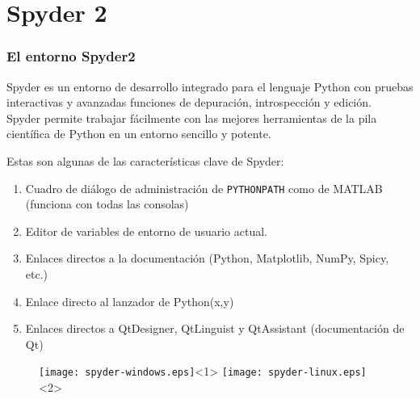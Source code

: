 \section{Spyder 2}
\begin{frame}
\frametitle{El entorno Spyder2}
Spyder es un entorno de desarrollo integrado para el lenguaje Python con pruebas interactivas y avanzadas funciones de depuraci\'{o}n, introspecci\'{o}n y edici\'{o}n.
\\
\medskip
Spyder permite trabajar f\'{a}cilmente con las mejores herramientas de la pila cient\'{i}fica de Python en un entorno sencillo y potente.
\end{frame}
\begin{frame}[fragile]
Estas son algunas de las caracter\'{i}sticas clave de Spyder:
\begin{enumerate}[<+->]
\item Cuadro de di\'{a}logo de administraci\'{o}n de \texttt{PYTHONPATH} como de MATLAB (funciona con todas las consolas)
\item Editor de variables de entorno de usuario actual.
\item Enlaces directos a la documentaci\'{o}n (Python, Matplotlib, NumPy, Spicy, etc.)
\item Enlace directo al lanzador de Python(x,y)
\item Enlaces directos a QtDesigner, QtLinguist y QtAssistant (documentación de Qt)
\end{enumerate}
\end{frame}
\begin{frame}
\begin{figure}
	\centering
	\texttt{[image: spyder-windows.eps]}<1>
	\texttt{[image: spyder-linux.eps]}<2> 
\end{figure}
\end{frame}
